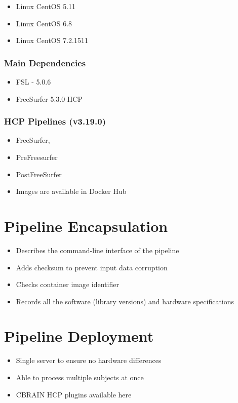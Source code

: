 \begin{itemize}
  \item Linux CentOS 5.11
  \item Linux CentOS 6.8 
  \item Linux CentOS 7.2.1511
\end{itemize}

\subsubsection{Main Dependencies}
\begin{itemize}
  \item FSL - 5.0.6
  \item FreeSurfer 5.3.0-HCP
\end{itemize}

\subsubsection{HCP Pipelines (v3.19.0)}
\begin{itemize}
  \item FreeSurfer,
  \item PreFreesurfer
  \item PostFreeSurfer
  \item Images are available in Docker Hub
\end{itemize}

\section{Pipeline Encapsulation}
\begin{itemize}
  \item Describes the command-line interface of the pipeline
  \item Adds checksum to prevent input data corruption
  \item Checks container image identifier
  \item Records all the software (library versions) and hardware specifications
\end{itemize}


\section{Pipeline Deployment}
\begin{itemize}
  \item Single server to ensure no hardware differences
  \item Able to process multiple subjects at once
  \item CBRAIN HCP plugins available here
\end{itemize}

